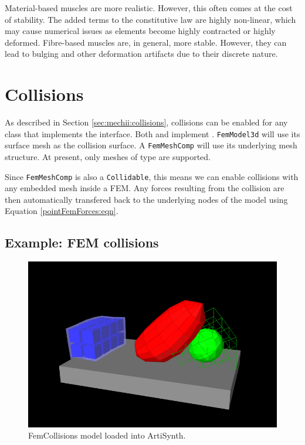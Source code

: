 Material-based muscles are more realistic.  However, this often comes at the cost
of stability.  The added terms to the constitutive law are highly non-linear,
which may cause numerical issues as elements become highly contracted or
highly deformed.  Fibre-based muscles are, in general, more stable.  However,
they can lead to bulging and other deformation artifacts due to their discrete
nature.

\section{Collisions}
\label{sec:fem:collision}

As described in Section \ref{sec:mechii:collisions}, collisions can be enabled 
for any class that implements the 
 interface.  Both 
 and 
 implement 
.  {\tt FemModel3d}
will use its surface mesh as the collision surface.  A {\tt FemMeshComp} will use
its underlying mesh structure.  At present, only meshes of type 
 are supported.

Since {\tt FemMeshComp} is also a {\tt Collidable}, this means we can enable 
collisions with any embedded mesh inside a FEM.  Any forces resulting from
the collision are then automatically transfered back to the underlying nodes 
of the model using Equation \eqref{pointFemForces:eqn}.

\subsection{Example: FEM collisions}

\begin{figure}[ht]
	\centering
	\includegraphics[width=\imglength]{images/FemCollisions}
	\caption{FemCollisions model loaded into ArtiSynth.}
	\label{fig:fem:collisions}
\end{figure}

